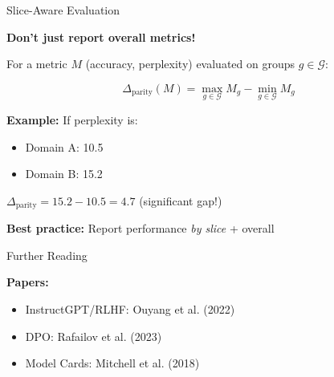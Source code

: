 \documentclass[xcolor=svgnames, 10pt, handout]{beamer}
\begin{document}
\begin{frame}{Slice-Aware Evaluation}

\textbf{Don't just report overall metrics!}

\pause

For a metric $M$ (accuracy, perplexity) evaluated on groups $g \in \mathcal{G}$:

\[
\Delta_{\text{parity}}(M) = \max_{g \in \mathcal{G}} M_g - \min_{g \in \mathcal{G}} M_g
\]

\pause

\textbf{Example:} If perplexity is:
\begin{itemize}
\item Domain A: 10.5
\item Domain B: 15.2
\end{itemize}

\pause

$\Delta_{\text{parity}} = 15.2 - 10.5 = 4.7$ (significant gap!)

\pause

\vspace{0.3cm}

\textbf{Best practice:} Report performance \textit{by slice} + overall

\end{frame}


\begin{frame}{Further Reading}

\textbf{Papers:}
\begin{itemize}
\item InstructGPT/RLHF: Ouyang et al. (2022)
\item DPO: Rafailov et al. (2023)
\item Model Cards: Mitchell et al. (2018)
\end{itemize}


\end{frame}
\end{document}

